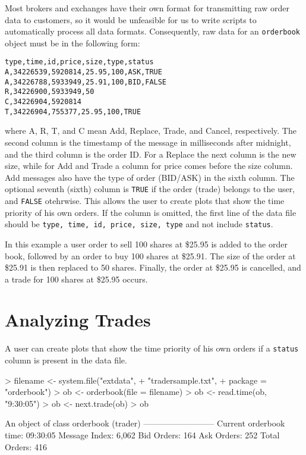 \documentclass[a4paper]{report}
\begin{document}
\begin{article}
Most brokers and exchanges have their own format for transmitting raw
order data to customers, so it would be unfeasible for us to write
scripts to automatically process all data formats. Consequently, raw
data for an \texttt{orderbook} object must be in the following form:

\begin{verbatim}
type,time,id,price,size,type,status
A,34226539,5920814,25.95,100,ASK,TRUE
A,34226788,5933949,25.91,100,BID,FALSE
R,34226900,5933949,50
C,34226904,5920814
T,34226904,755377,25.95,100,TRUE
\end{verbatim}

\noindent where A, R, T, and C mean Add, Replace, Trade, and Cancel,
respectively. The second column is the timestamp of the message in
milliseconds after midnight, and the third column is the order ID. For
a Replace the next column is the new size, while for Add and Trade a
column for price comes before the size column. Add messages also have
the type of order (BID/ASK) in the sixth column. The optional seventh
(sixth) column is \texttt{TRUE} if the order (trade) belongs to the
user, and \texttt{FALSE} otehrwise. This allows the user to create
plots that show the time priority of his own orders. If the column is
omitted, the first line of the data file should be \texttt{type, time,
  id, price, size, type} and not include \texttt{status}.

In this example a user order to sell 100 shares at \$25.95 is added to the
order book, followed by an order to buy 100 shares at \$25.91. The
 size of the order at \$25.91 is then replaced to 50 shares. Finally,
 the order at \$25.95 is cancelled, and a trade for 100 shares
 at \$25.95 occurs.

\section{Analyzing Trades}

A user can create plots that show the time priority of his own orders
if a \texttt{status} column is present in the data file.

\begin{Schunk}
\begin{Sinput}
> filename <- system.file("extdata",
+                         "tradersample.txt",
+                         package = "orderbook")
> ob <- orderbook(file = filename)
> ob <- read.time(ob, "9:30:05")
> ob <- next.trade(ob)
> ob
\end{Sinput}
\begin{Soutput}
An object of class orderbook (trader)
--------------------------
Current orderbook time:    09:30:05 
Message Index:             6,062 
Bid Orders:                164 
Ask Orders:                252 
Total Orders:              416 
\end{Soutput}
\end{Schunk}


\end{article}
\end{document}
